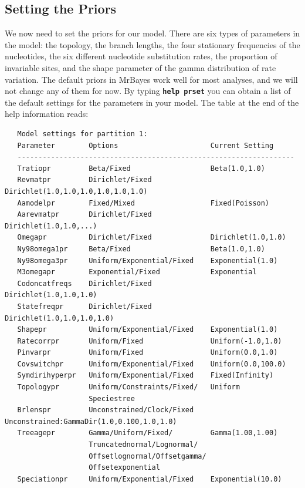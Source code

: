 \documentclass[12pt]{book}
\newcommand{\ttt}[1]{\texttt{#1} }
\newcommand{\tb}[1]{\ttt{\textbf{#1}} }
\begin{document}
\subsection{Setting the Priors}
We now need to set the priors for our model. There are six types of parameters in the model: the
topology, the branch lengths, the four stationary frequencies of the nucleotides, the six different
nucleotide substitution rates, the proportion of invariable sites, and the shape parameter of the
gamma distribution of rate variation. The default priors in MrBayes work well for most analyses,
and we will not change any of them for now. By typing \tb{help prset} you can obtain a list of
the default settings for the parameters in your model. The table at the end of the help information
reads:

\begin{singlespacing}
\scriptsize
\begin{verbatim}
   Model settings for partition 1:
   Parameter        Options                      Current Setting
   ------------------------------------------------------------------
   Tratiopr         Beta/Fixed                   Beta(1.0,1.0)
   Revmatpr         Dirichlet/Fixed              Dirichlet(1.0,1.0,1.0,1.0,1.0,1.0)
   Aamodelpr        Fixed/Mixed                  Fixed(Poisson)
   Aarevmatpr       Dirichlet/Fixed              Dirichlet(1.0,1.0,...)
   Omegapr          Dirichlet/Fixed              Dirichlet(1.0,1.0)
   Ny98omega1pr     Beta/Fixed                   Beta(1.0,1.0)
   Ny98omega3pr     Uniform/Exponential/Fixed    Exponential(1.0)
   M3omegapr        Exponential/Fixed            Exponential
   Codoncatfreqs    Dirichlet/Fixed              Dirichlet(1.0,1.0,1.0)
   Statefreqpr      Dirichlet/Fixed              Dirichlet(1.0,1.0,1.0,1.0)
   Shapepr          Uniform/Exponential/Fixed    Exponential(1.0)
   Ratecorrpr       Uniform/Fixed                Uniform(-1.0,1.0)
   Pinvarpr         Uniform/Fixed                Uniform(0.0,1.0)
   Covswitchpr      Uniform/Exponential/Fixed    Uniform(0.0,100.0)
   Symdirihyperpr   Uniform/Exponential/Fixed    Fixed(Infinity)
   Topologypr       Uniform/Constraints/Fixed/   Uniform
                    Speciestree
   Brlenspr         Unconstrained/Clock/Fixed    Unconstrained:GammaDir(1.0,0.100,1.0,1.0)
   Treeagepr        Gamma/Uniform/Fixed/         Gamma(1.00,1.00)
                    Truncatednormal/Lognormal/
                    Offsetlognormal/Offsetgamma/
                    Offsetexponential
   Speciationpr     Uniform/Exponential/Fixed    Exponential(10.0)

\end{verbatim}
\end{singlespacing}
\end{document}

